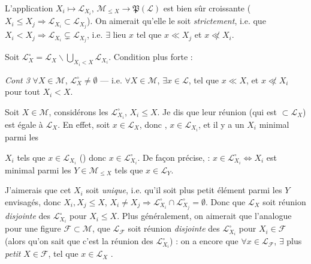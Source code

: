 \documentclass[11pt,a4paper]{article}
\begin{document}
 L'application $X_i \mapsto \mathcal{L}_{X_i}$, $\mathcal{M}_{\leq X} \to \mathfrak{P}(\mathcal{L})$ est bien sûr croissante ($X_i \leq X_j \Rightarrow \mathcal{L}_{X_i} \subset \mathcal{L}_{X_j}$). On aimerait qu'elle le soit \emph{strictement}, i.e. que $X_i < X_j \Rightarrow \mathcal{L}_{X_i} \subsetneq \mathcal{L}_{X_j}$, i.e. $\exists$ lieu $x$ tel que $x \ll X_j$ et $x \not\ll X_i$.

Soit $\mathcal{L}^{\circ}_X = \mathcal{L}_X \smallsetminus \bigcup_{X_i < X} \mathcal{L}_{X_i}$. Condition plus forte :

\emph{Cont 3} \quad $\forall X \in \mathcal{M}$, $\mathcal{L}^{\circ}_X \neq \emptyset$ — i.e. $\forall X \in \mathcal{M}$, $\exists x \in \mathcal{L}$, tel que $x \ll X$, et $x \not\ll X_i$ pour tout $X_i < X$.


Soit $X \in \mathcal{M}$, considérons les $\mathcal{L}^{\circ}_{X_i}$, $X_i \leq X$. Je dis que leur réunion (qui est $\subset \mathcal{L}_X$) est égale à $\mathcal{L}_X$. En effet, soit $x \in \mathcal{L}_X$, donc \struck{$\exists$} \ill{}, $x \in \mathcal{L}_{X_i}$, \struck{\ill{}} et \struck{\ill{}} il y a un $X_i$ minimal parmi les

$X_i$ tels que $x \in \mathcal{L}_{X_i}$ (\ill{}) donc $x \in \mathcal{L}^{\circ}_{X_i}$. De façon précise, \ill{} : $x \in \mathcal{L}^{\circ}_{X_i} \Leftrightarrow X_i$ est minimal parmi les $Y \in \mathcal{M}_{\leq X}$ tels que $x \in \mathcal{L}_Y$.

J'aimerais que cet $X_i$ soit \emph{unique}, i.e. qu'il soit  plus petit élément parmi les $Y$ envisagés, donc $X_i, X_j \leq X$, $X_i \neq X_j \Rightarrow \mathcal{L}^{\circ}_{X_i} \cap \mathcal{L}^{\circ}_{X_j} = \emptyset$. Donc que $\mathcal{L}_X$ soit réunion \emph{disjointe} des $\mathcal{L}^{\circ}_{X_i}$ pour $X_i \leq X$. Plus généralement, on aimerait que l'analogue  pour  une figure $\mathcal{F} \subset \mathcal{M}$,  que $\mathcal{L}_{\mathcal{F}}$ soit réunion \emph{disjointe} des \struck{\ill{}} $\mathcal{L}^{\circ}_{X_i}$ pour $X_i \in \mathcal{F}$ (alors qu'on sait  que c'est la réunion des $\mathcal{L}^{\circ}_{X_i}$) : on a encore que $\forall x \in \mathcal{L}_{\mathcal{F}}$, $\exists$ plus \emph{petit} $X \in \mathcal{F}$, tel que $x \in \mathcal{L}_X$ \struck{\ill{}}.
\end{document}

